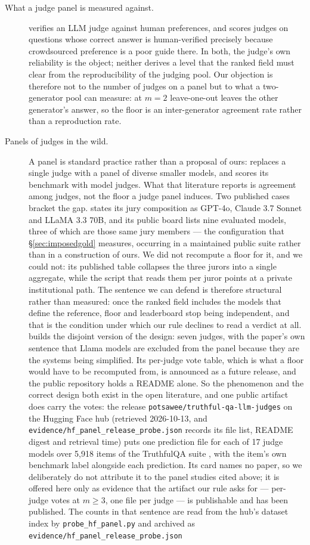 \documentclass{article}
\newcommand{\ids}[1]{\texttt{\small #1}} %
\begin{document}
\begin{description}
\item[What a judge panel is measured against.] \cite{zheng2023judging} verifies an LLM judge against human preferences, and \cite{tan2024judgebench} scores judges on questions whose correct answer is human-verified precisely because crowdsourced preference is a poor guide there. In both, the judge's own reliability is the object; neither derives a level that the ranked field must clear from the reproducibility of the judging pool. Our objection is therefore not to the number of judges on a panel but to what a two-generator pool can measure: at $m=2$ leave-one-out leaves the other generator's answer, so the floor is an inter-generator agreement rate rather than a reproduction rate.
\item[Panels of judges in the wild.] A panel is standard practice rather than a proposal of ours: \cite{verga2024juries} replaces a single judge with a panel of diverse smaller models, and \cite{zheng2023judging} scores its benchmark with model judges. What that literature reports is agreement among judges, not the floor a judge panel induces. Two published cases bracket the gap. \cite{bedi2025medhelm} states its jury composition as GPT-4o, Claude 3.7 Sonnet and LLaMA 3.3 70B, and its public board lists nine evaluated models, three of which are those same jury members --- the configuration that \S\ref{sec:imposedgold} measures, occurring in a maintained public suite rather than in a construction of ours. We did not recompute a floor for it, and we could not: its published table collapses the three jurors into a single aggregate, while the script that reads them per juror points at a private institutional path. The sentence we can defend is therefore structural rather than measured: once the ranked field includes the models that define the reference, floor and leaderboard stop being independent, and that is the condition under which our rule declines to read a verdict at all. \cite{liu2025imperfect} builds the disjoint version of the design: seven judges, with the paper's own sentence that Llama models are excluded from the panel because they are the systems being simplified. Its per-judge vote table, which is what a floor would have to be recomputed from, is announced as a future release, and the public repository holds a README alone. So the phenomenon and the correct design both exist in the open literature, and one public artifact does carry the votes: the release \ids{potsawee/truthful-qa-llm-judges} on the Hugging Face hub (retrieved 2026-10-13, and \ids{evidence/hf\_panel\_release\_probe.json} records its file list, README digest and retrieval time) puts one prediction file for each of 17 judge models over 5,918 items of the TruthfulQA suite \cite{lin2022truthfulqa}, with the item's own benchmark label alongside each prediction. Its card names no paper, so we deliberately do not attribute it to the panel studies cited above; it is offered here only as evidence that the artifact our rule asks for --- per-judge votes at $m \ge 3$, one file per judge --- is publishable and has been published. The counts in that sentence are read from the hub's dataset index by \ids{probe\_hf\_panel.py} and archived as \ids{evidence/hf\_panel\_release\_probe.json} 
\end{description}
\end{document}
